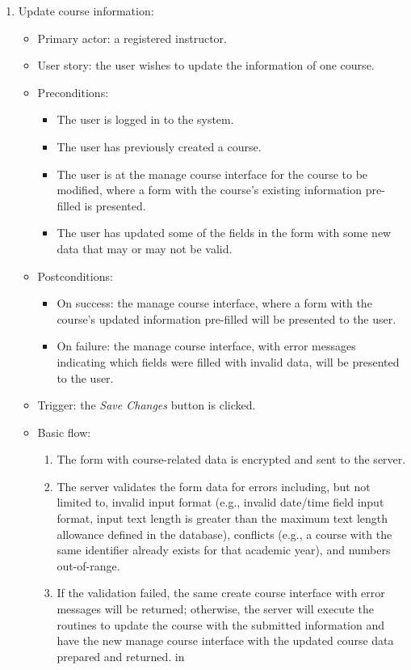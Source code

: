 \begin{enumerate}
\item Update course information:
\begin{itemize}
    \item Primary actor: a registered instructor.
    \item User story: the user wishes to update the information of one course.
        \baselineskip
    \item Preconditions:
        \begin{itemize}
            \item The user is logged in to the system.
            \item The user has previously created a course.
            \item The user is at the manage course interface for the course to
                be modified, where a form with
                the course's existing information pre-filled is presented.
            \item The user has updated some of the fields in the form with some
                new data that may or may not be valid.
        \end{itemize}
    \item Postconditions:
        \begin{itemize}
            \item On success: the manage course interface, where a form with
                the course's updated information pre-filled will be presented
                to the user.
            \item On failure: the manage course interface, with error messages
                indicating which fields were filled with invalid data, will be
                presented to the user.
        \end{itemize}
    \item Trigger: the \emph{Save Changes} button is clicked.
    \item Basic flow:
        \begin{enumerate}
            \item The form with course-related data is encrypted and sent to
                the server.
            \item The server validates the form data for errors including,
                but not limited to,
                invalid input format
                (e.g., invalid date/time field input format,
                input text length is greater than the maximum text length
                allowance defined in the database),
                conflicts (e.g., a course with the same identifier  
                already exists for that academic year),
                and numbers out-of-range.
            \item If the validation failed, the same create course interface
                with error messages will be returned; otherwise, the server will
                execute the routines to update the course with the submitted 
                information and have the new manage course interface with the
                updated course data prepared and returned.
             in
        \end{enumerate}
\end{itemize}


\end{enumerate}
